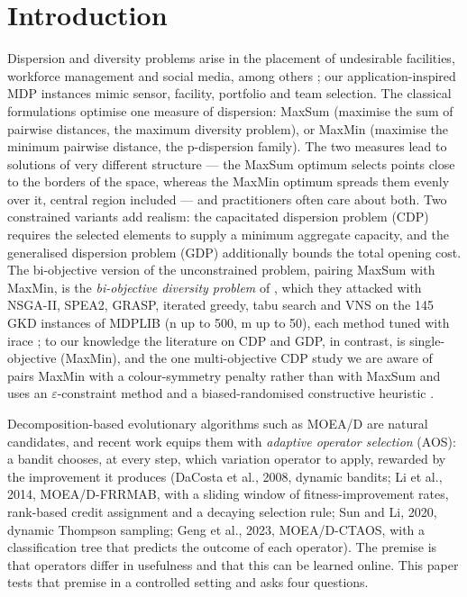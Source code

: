 \section{Introduction}\label{sec:introduction}

Dispersion and diversity problems arise in the placement of undesirable facilities, workforce management and social media, among others \citep{peiro2021}; our application-inspired MDP instances mimic sensor, facility, portfolio and team selection. The classical formulations optimise one measure of dispersion: MaxSum (maximise the sum of pairwise distances, the maximum diversity problem), or MaxMin (maximise the minimum pairwise distance, the p-dispersion family). The two measures lead to solutions of very different structure --- the MaxSum optimum selects points close to the borders of the space, whereas the MaxMin optimum spreads them evenly over it, central region included \citep{parreno2021} --- and practitioners often care about both. Two constrained variants add realism: the capacitated dispersion problem (CDP) requires the selected elements to supply a minimum aggregate capacity, and the generalised dispersion problem (GDP) additionally bounds the total opening cost. The bi-objective version of the unconstrained problem, pairing MaxSum with MaxMin, is the \emph{bi-objective diversity problem} of \citet{colmenar2018}, which they attacked with NSGA-II, SPEA2, GRASP, iterated greedy, tabu search and VNS on the 145 GKD instances of MDPLIB (n up to 500, m up to 50), each method tuned with irace \citep{lopezibanez2016}; to our knowledge the literature on CDP and GDP, in contrast, is single-objective (MaxMin), and the one multi-objective CDP study we are aware of pairs MaxMin with a colour-symmetry penalty rather than with MaxSum and uses an $\varepsilon$-constraint method and a biased-randomised constructive heuristic \citep{gomez2026}.

Decomposition-based evolutionary algorithms such as MOEA/D \citep{zhang2007} are natural candidates, and recent work equips them with \emph{adaptive operator selection} (AOS): a bandit chooses, at every step, which variation operator to apply, rewarded by the improvement it produces (DaCosta et al., 2008, dynamic bandits; Li et al., 2014, MOEA/D-FRRMAB, with a sliding window of fitness-improvement rates, rank-based credit assignment and a decaying selection rule; Sun and Li, 2020, dynamic Thompson sampling; Geng et al., 2023, MOEA/D-CTAOS, with a classification tree that predicts the outcome of each operator). The premise is that operators differ in usefulness and that this can be learned online. This paper tests that premise in a controlled setting and asks four questions.

